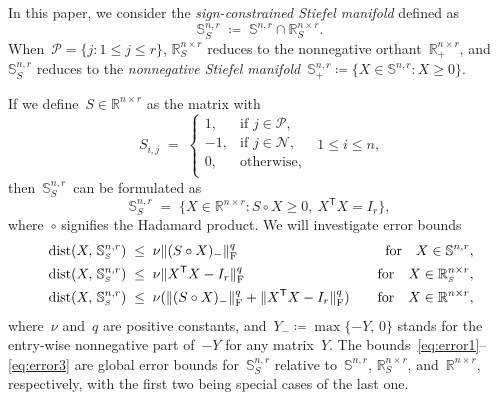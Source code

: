 \documentclass[11pt,a4paper]{article}  %
\theoremstyle{definition}
\DeclareMathOperator{\dist}{dist}
\newcommand{\RR}{\mathbb{R}}
\newcommand{\col}{r}
\newcommand{\stf}[1]{\mathbb{S}^{#1}}
\newcommand{\fro}{{\scriptstyle{\textnormal{F}}}}
\newcommand{\trs}{{\scriptstyle{\mathsf{T}}}}
\newcommand{\signmat}{S}
\newcommand{\tsign}{{\scriptscriptstyle{S}}}
\newcommand{\posset}{\mathcal{P}}
\newcommand{\negset}{\mathcal{N}}
\newcommand{\hp}{\circ}
\begin{document}
In this paper, we consider the \emph{sign-constrained Stiefel manifold}
defined as
\begin{equation}
    \nonumber
    \stf{n,\col}_{\tsign} \;\coloneqq\; \stf{n,\col} \!\cap \RR^{n\times \col}_{\tsign}.
\end{equation}
When~$\posset = \{j\mathrel{:} 1\le j \le \col\}$, $\RR^{n\times\col}_\tsign$ reduces to the
nonnegative orthant~$\RR^{n\times \col}_+$, and~$\stf{n,\col}_\tsign$ reduces to the
\emph{nonnegative Stiefel manifold}~$\stf{n,\col}_+ \coloneqq \{X\in \stf{n,\col}\mathrel{:} X \ge 0\}$.

If we define~$\signmat\in\RR^{n\times \col}$ as the matrix with
\begin{equation}
    \nonumber
    S_{i,j} \;=\;
    \begin{cases}
        1, & \text{if } j \in \posset,\\
        -1, & \text{if } j \in \negset,\\
        0, & \text{otherwise},\\
    \end{cases}
    ~\;~ 1\le i \le n,
\end{equation}
then~$\stf{n,\col}_{\tsign}$~\!can be formulated as
\begin{equation}
    \nonumber
    \stf{n,\col}_{\tsign} \;=\; \{X\in \RR^{n\times\col} \mathrel{:} \signmat \hp X \ge 0, ~X^\trs
    X = I_\col\},
\end{equation}
where~$\hp$ signifies the Hadamard product.
We will investigate error bounds
  \begin{eqnarray}
  \label{eq:error1}
  & \dist(X,\, \stf{n,\col}_\tsign) \;\le\;  \nu \|(\signmat \hp X)_{-}\|_\fro^q & \quad \text{for} \quad X \in\stf{n,\col},\\
  \label{eq:error2}
  &\dist(X,\, \stf{n,\col}_\tsign) \;\le\; \nu\|X^\trs X-I_\col\|_\fro^q& \quad \text{for} \quad
       X \in \RR^{n\times \col}_\tsign,\\
  \label{eq:error3}
  & \dist(X,\, \stf{n,\col}_\tsign)  \;\le\; \nu(\|(\signmat\hp X)_{-}\|_\fro^{q} +
  \|X^\trs X-I_\col\|_\fro^{q})
      &\quad \text{for} \quad X \in \RR^{n\times \col},
   \end{eqnarray}
where~$\nu$ and~$q$ are positive constants,
and~$Y_{-}\coloneqq \max\{-Y, \, 0\}$ stands for the entry-wise nonnegative part of~$-Y$ for any
matrix~$Y$.
The bounds~\mbox{\eqref{eq:error1}--\eqref{eq:error3}}
are global error bounds for~$\stf{n,\col}_\tsign$ relative to~$\stf{n,\col}$,
$\RR^{n\times \col}_\tsign$, and~$\RR^{n\times \col}$, respectively, with the first two being
special cases of the last one.
\end{document}
